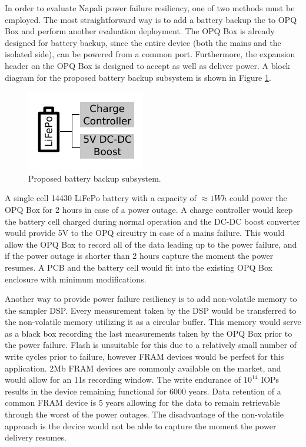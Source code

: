 In order to evaluate Napali power failure resiliency, one of two methods must be employed.
The most straightforward way is to add a battery backup the to OPQ Box and perform another evaluation deployment.
The OPQ Box is already designed for battery backup, since the entire device (both the mains and the isolated side), can be powered from a common port.
Furthermore, the expansion header on the OPQ Box is designed to accept as well as deliver power.
A block diagram for the proposed battery backup subsystem is shown in Figure \ref{fig:conc:bat}.
\begin{figure}[ht!]
    \centering
    \includegraphics[width=0.5\linewidth]{img/conclusions/battery.pdf}
    \caption{Proposed battery backup subsystem.}
    \label{fig:conc:bat}
\end{figure}
A single cell 14430 LiFePo battery with a capacity of $\approx 1Wh$ could power the OPQ Box for 2 hours in case of a power outage.
A charge controller would keep the battery cell charged during normal operation and the DC-DC boost converter would provide 5V to the OPQ circuitry in case of a mains failure.
This would allow the OPQ Box to record all of the data leading up to the power failure, and if the power outage is shorter than 2 hours capture the moment the power resumes.
A PCB and the battery cell would fit into the existing OPQ Box enclosure with minimum modifications.

Another way to provide power failure resiliency is to add non-volatile memory to the sampler DSP.
Every measurement taken by the DSP would be transferred to the non-volatile memory utilizing it as a circular buffer.
This memory would serve as a black box recording the last measurements taken by the OPQ Box prior to the power failure.
Flash is unsuitable for this due to a relatively small number of write cycles prior to failure, however FRAM devices would be perfect for this application.
2Mb FRAM devices are commonly available on the market, and would allow for an 11s recording window.
The write endurance of $10^{14}$ IOPs results in the device remaining functional for 6000 years.
Data retention of a common FRAM device is 5 years allowing for the data to remain retrievable through the worst of the power outages.
The disadvantage of the non-volatile approach is the device would not be able to capture the moment the power delivery resumes.

